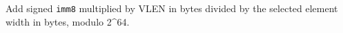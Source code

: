 Add signed \texttt{imm8} multiplied by VLEN in bytes divided by the selected element width in bytes, modulo 2\textasciicircum{}64.
